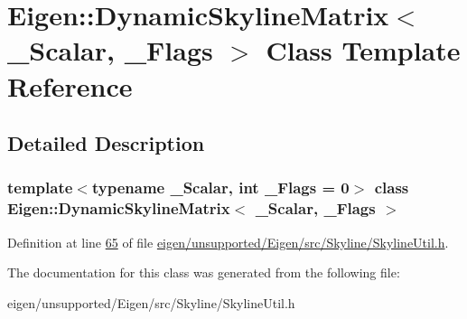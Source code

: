 \hypertarget{class_eigen_1_1_dynamic_skyline_matrix}{}\section{Eigen\+:\+:Dynamic\+Skyline\+Matrix$<$ \+\_\+\+Scalar, \+\_\+\+Flags $>$ Class Template Reference}
\label{class_eigen_1_1_dynamic_skyline_matrix}


\subsection{Detailed Description}
\subsubsection*{template$<$typename \+\_\+\+Scalar, int \+\_\+\+Flags = 0$>$\newline
class Eigen\+::\+Dynamic\+Skyline\+Matrix$<$ \+\_\+\+Scalar, \+\_\+\+Flags $>$}



Definition at line \hyperlink{eigen_2unsupported_2_eigen_2src_2_skyline_2_skyline_util_8h_source_l00065}{65} of file \hyperlink{eigen_2unsupported_2_eigen_2src_2_skyline_2_skyline_util_8h_source}{eigen/unsupported/\+Eigen/src/\+Skyline/\+Skyline\+Util.\+h}.



The documentation for this class was generated from the following file\+:\begin{DoxyCompactItemize}
\item 
eigen/unsupported/\+Eigen/src/\+Skyline/\+Skyline\+Util.\+h\end{DoxyCompactItemize}

